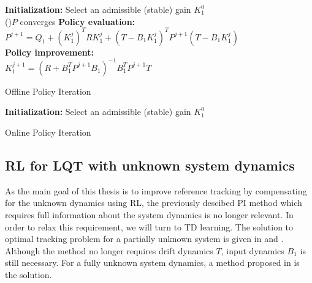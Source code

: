 \begin{algorithm}[H]
	\textbf{Initialization:} Select an admissible (stable) gain $K^0_1$\\
	\Repeat(){$ P $ converges}{
		\textbf{Policy evaluation:} \\
		$P^{j+1} = Q_1 + (K_1^j)^TRK_1^j + (T-B_1K_1^j)^TP^{j+1}(T-B_1K_1^j)$\\
		
		\textbf{Policy improvement:} \\
		$ K_1^{j+1} = (R+B_1^TP^{j+1}B_1)^{-1} B_1^TP^{j+1}T $\\	
	}
	\label{alg:off_pi}
	\caption{Offline Policy Iteration}
\end{algorithm}

\begin{algorithm}[H]
	\textbf{Initialization:} Select an admissible (stable) gain $K^0_1$\\
	\label{alg:on_pi}
	\caption{Online Policy Iteration}
\end{algorithm}

\subsection{\ac{RL} for \ac{LQT} with unknown system dynamics}
As the main goal of this thesis is to improve reference tracking by compensating for the unknown dynamics using \ac {RL}, the previously descibed \ac {PI} method which requires full information about the system dynamics is no longer relevant. In order to relax this requirement, we will turn to \ac {TD} learning. The solution to optimal tracking problem for a partially unknown system is given in \cite{Kiumarsi6760476} \cite{Kiumarsi6918527} and \cite{Modares20141780}. Although the method no longer requires drift dynamics $T$, input dynamics $B_1$ is still necessary. For a fully unknown system dynamics, a method proposed in \cite{Kiumarsi20141167} is the solution. 

